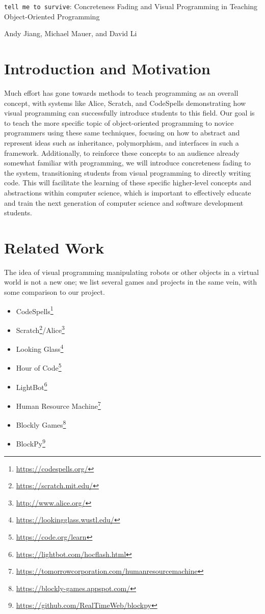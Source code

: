 \documentclass[12pt,notitlepage]{article}
\newcommand\footref[1]{\footnote{\url{#1}}}
\begin{document}
\begingroup
  \centering
  {\Large {\tt tell me to survive}: Concreteness Fading and Visual
    Programming in Teaching Object-Oriented Programming\\[1em]}

  Andy Jiang, Michael Mauer, and David Li\par
\endgroup

\section{Introduction and Motivation}

Much effort has gone towards methods to teach programming as an
overall concept, with systems like Alice, Scratch, and CodeSpells
demonstrating how visual programming can successfully introduce
students to this field. Our goal is to teach the more specific topic
of object-oriented programming to novice programmers using these same
techniques, focusing on how to abstract and represent ideas such as
inheritance, polymorphism, and interfaces in such a framework.
Additionally, to reinforce these concepts to an audience already
somewhat familiar with programming, we will introduce concreteness
fading to the system, transitioning students from visual programming
to directly writing code. This will facilitate the learning of these
specific higher-level concepts and abstractions within computer
science, which is important to effectively educate and train the next
generation of computer science and software development students.

\section{Related Work}

The idea of visual programming manipulating robots or other objects in
a virtual world is not a new one; we list several games and projects
in the same vein, with some comparison to our project.

\begin{itemize}
\item CodeSpells\footref{https://codespells.org/}
\item Scratch\footref{https://scratch.mit.edu/}/Alice\footref{http://www.alice.org/}
\item Looking Glass\footref{https://lookingglass.wustl.edu/}
\item Hour of Code\footref{https://code.org/learn}
\item LightBot\footref{https://lightbot.com/hocflash.html}
\item Human Resource Machine\footref{https://tomorrowcorporation.com/humanresourcemachine}
\item Blockly Games\footref{https://blockly-games.appspot.com/}
\item BlockPy\footref{https://github.com/RealTimeWeb/blockpy}
\end{itemize}
\end{document}
